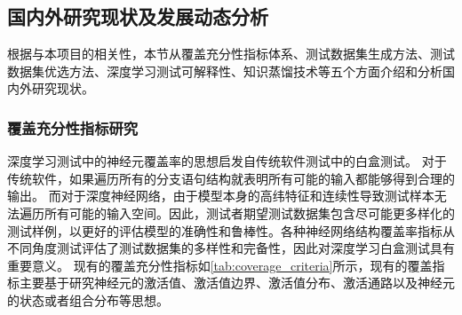 \subsection{国内外研究现状及发展动态分析}\label{relatedwork}


根据与本项目的相关性，本节从覆盖充分性指标体系、测试数据集生成方法、测试数据集优选方法、深度学习测试可解释性、知识蒸馏技术等五个方面介绍和分析国内外研究现状。





\subsubsection{覆盖充分性指标研究}

深度学习测试中的神经元覆盖率的思想启发自传统软件测试中的白盒测试。
对于传统软件，如果遍历所有的分支语句结构就表明所有可能的输入都能够得到合理的输出。
而对于深度神经网络，由于模型本身的高纬特征和连续性导致测试样本无法遍历所有可能的输入空间。因此，测试者期望测试数据集包含尽可能更多样化的测试样例，以更好的评估模型的准确性和鲁棒性。各种神经网络结构覆盖率指标从不同角度测试评估了测试数据集的多样性和完备性，因此对深度学习白盒测试具有重要意义。
现有的覆盖充分性指标如\cref{tab:coverage_criteria}所示，现有的覆盖指标主要基于研究神经元的激活值、激活值边界、激活值分布、激活通路以及神经元的状态或者组合分布等思想。

